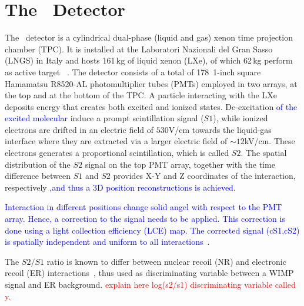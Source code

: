 \section{The \Xehund\  Detector}
The \Xehund\ detector is a cylindrical %
dual-phase (liquid and gas) xenon time projection chamber (TPC). It is installed at the Laboratori Nazionali del Gran Sasso (LNGS) in Italy
and hosts 161\,kg of liquid xenon (LXe), of which 62\,kg perform as active target ~\cite{xe100_instr2012}. 
The detector consists of a total of 178~1-inch square Hamamatsu R8520-AL photomultiplier tubes (PMTs) employed in two arrays, at the top and at the bottom of the TPC. 
A particle interacting with the LXe deposits energy that creates both excited and ionized states. De-excitation \textcolor{blue} {of the excited molecular} induce a prompt scintillation signal ($S1$), while 
ionized electrons are drifted in an electric field of $530$V/cm towards the liquid-gas interface where they are extracted via a larger electric field of $\sim12$kV/cm. 
These electrons generates a proportional scintillation, which is called $S2$. The spatial distribution of the $S2$ signal on the top PMT array, together with the time difference between $S1$ and $S2$ provides X-Y and Z coordinates of the interaction, respectively \textcolor{blue}{,and thus a 3D position reconstructions is achieved}. 

\textcolor{blue}{Interaction in different positions change solid angel with respect to the PMT array. Hence, a correction to the signal needs to be applied. This correction is done using a  light collection efficiency (LCE) map. The corrected signal (cS1,cS2) is spatially independent and uniform to all interactions~\cite{xe100_instr2012}}.

The $S2/S1$ ratio is known to differ between nuclear recoil (NR) and electronic recoil (ER) interactions~\cite{}, thus used as  discriminating variable between a WIMP signal and ER background.
\textcolor{red}{explain here log(s2/s1) discriminating variable called y.} %

      
